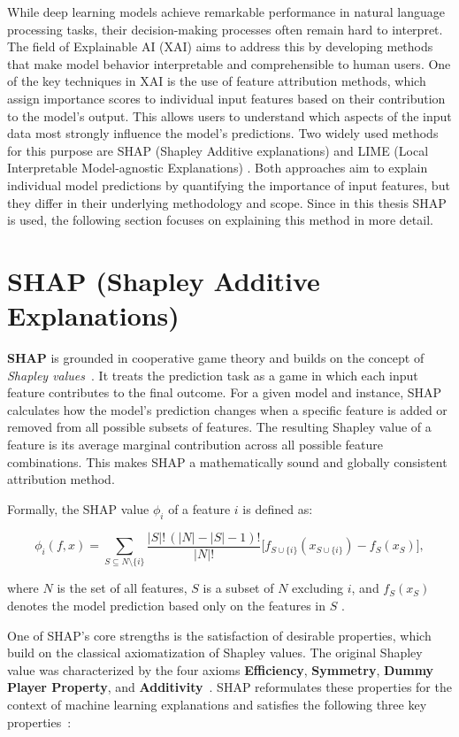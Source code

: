While deep learning models achieve remarkable performance in natural language processing tasks, their decision-making processes often remain hard to interpret. The field of Explainable AI (XAI) aims to address this by developing methods that make model behavior interpretable and comprehensible to human users.  One of the key techniques in XAI is the use of feature attribution methods, which assign importance scores to individual input features based on their contribution to the model's output. This allows users to understand which aspects of the input data most strongly influence the model's predictions. Two widely used methods for this purpose are SHAP (Shapley Additive explanations) \cite{lundberg2017shap} and LIME (Local Interpretable Model-agnostic Explanations) \cite{ribeiro2016lime}. Both approaches aim to explain individual model predictions by quantifying the importance of input features, but they differ in their underlying methodology and scope. Since in this thesis SHAP is used, the following section focuses on explaining this method in more detail. 


\section{SHAP (Shapley Additive Explanations)}
\textbf{SHAP} is grounded in cooperative game theory and builds on the concept of \emph{Shapley values}~\cite{lundberg2017shap}. It treats the prediction task as a game in which each input feature contributes to the final outcome. For a given model and instance, SHAP calculates how the model's prediction changes when a specific feature is added or removed from all possible subsets of features. The resulting Shapley value of a feature is its average marginal contribution across all possible feature combinations. This makes SHAP a mathematically sound and globally consistent attribution method. \cite{lundberg2017shap}

Formally, the SHAP value $\phi_i$ of a feature $i$ is defined as:

\[
\phi_i(f, x) = 
\sum_{S \subseteq N \setminus \{i\}} 
\frac{|S|!\,(|N|-|S|-1)!}{|N|!} 
\Big[ f_{S \cup \{i\}}(x_{S \cup \{i\}}) - f_S(x_S) \Big],
\]

where $N$ is the set of all features, $S$ is a subset of $N$ excluding $i$, and 
$f_S(x_S)$ denotes the model prediction based only on the features in $S$ 
\cite{lundberg2017shap}.

One of SHAP's core strengths is the satisfaction of desirable properties, which build on the classical axiomatization of Shapley values. The original Shapley value was characterized by the four axioms \textbf{Efficiency}, \textbf{Symmetry}, \textbf{Dummy Player Property}, and \textbf{Additivity}~\cite{shapley1953value}. SHAP reformulates these properties for the context of machine learning explanations and satisfies the following three key properties~\cite{lundberg2017shap}:


